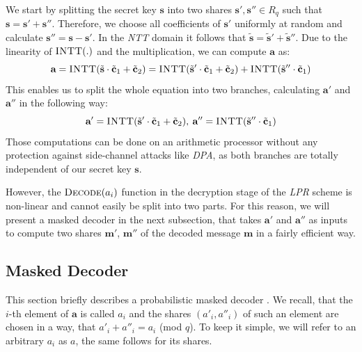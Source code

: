 We start by splitting the secret key \(\textbf{s}\) into two shares \(\textbf{s}',\textbf{s}'' \in R_q\) such that \(\textbf{s}=\textbf{s}'+\textbf{s}''\). Therefore, we choose all coefficients of \(\textbf{s}'\) uniformly at random and calculate \(\textbf{s}''=\textbf{s}-\textbf{s}'\). In the \textit{\ac{NTT}} domain it follows that \(\tilde{\textbf{s}}=\tilde{\textbf{s}}'+\tilde{\textbf{s}}''\). Due to the linearity of \(\textsc{INTT}(.)\) and the multiplication, we can compute \(\textbf{a}\) as:
\begin{equation}
	\textbf{a}=\textsc{INTT}(\tilde{\textbf{s}} \cdot \tilde{\textbf{c}}_1+\tilde{\textbf{c}}_2)=\textsc{INTT}(\tilde{\textbf{s}}' \cdot \tilde{\textbf{c}}_1+\tilde{\textbf{c}}_2)+\textsc{INTT}(\tilde{\textbf{s}}'' \cdot \tilde{\textbf{c}}_1)
\end{equation}
This enables us to split the whole equation into two branches, calculating \(\textbf{a}'\) and \(\textbf{a}''\) in the following way:
\begin{equation}
	\textbf{a}'=\textsc{INTT}(\tilde{\textbf{s}}' \cdot \tilde{\textbf{c}}_1+\tilde{\textbf{c}}_2),\:\textbf{a}''=\textsc{INTT}(\tilde{\textbf{s}}'' \cdot \tilde{\textbf{c}}_1)
\end{equation}
Those computations can be done on an arithmetic processor without any protection against side-channel attacks like \textit{\ac{DPA}}, as both branches are totally independent of our secret key \(\textbf{s}\).

However, the \(\textsc{Decode}(a_{i})\) function in the decryption stage of the \textit{\ac{LPR}} scheme is non-linear and cannot easily be split into two parts. For this reason, we will present a masked decoder in the next subsection, that takes \(\textbf{a}'\) and \(\textbf{a}''\) as inputs to compute two shares \(\textbf{m}'\), \(\textbf{m}''\) of the decoded message \(\textbf{m}\) in a fairly efficient way.

\subsection{Masked Decoder}
This section briefly describes a probabilistic masked decoder \cite{maskedRing}. We recall, that the \(i\)-th element of \(\textbf{a}\) is called \(a_i\) and the shares \((a'_i,a''_i)\) of such an element are chosen in a way, that \(a'_i + a''_i = a_i\) (mod \(q\)). To keep it simple, we will refer to an arbitrary \(a_i\) as \(a\), the same follows for its shares.

